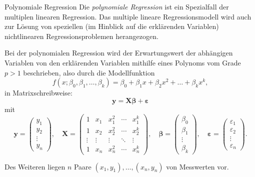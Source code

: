\begin{defi}{Polynomiale Regression}
    Die \emph{polynomiale Regression} ist ein Spezialfall der multiplen linearen Regression.
    Das multiple lineare Regressionsmodell wird auch zur Lösung von speziellen (im Hinblick auf die erklärenden Variablen) nichtlinearen Regressionsproblemen herangezogen.

    Bei der polynomialen Regression wird der Erwartungswert der abhängigen Variablen von den erklärenden Variablen mithilfe eines Polynoms vom Grade $p > 1$ beschrieben, also durch die Modellfunktion
    \[
        f(x; \beta_0, \beta_1, \ldots, \beta_k) = \beta_0 + \beta_1 x + \beta_2 x^2 + \ldots + \beta_k x^k,
    \]
    in Matrixschreibweise:
    \[
        \mathbf{y} = \mathbf{X} \boldsymbol{\beta} + \boldsymbol{\varepsilon}
    \]
    mit
    \[
        \mathbf{y} = \begin{pmatrix}
            y_1 \\ y_2 \\ \vdots \\ y_n
        \end{pmatrix},
        \quad \mathbf{X} = \begin{pmatrix}
            1      & x_{1}  & x_{1}^2 & \cdots & x_{1}^k \\
            1      & x_{2}  & x_{2}^2 & \cdots & x_{2}^k \\
            \vdots & \vdots & \vdots  & \ddots & \vdots  \\
            1      & x_{n}  & x_{n}^2 & \cdots & x_{n}^k
        \end{pmatrix},
        \quad \boldsymbol{\beta} = \begin{pmatrix}
            \beta_0 \\ \beta_1 \\ \vdots \\ \beta_k
        \end{pmatrix},
        \quad \boldsymbol{\varepsilon} = \begin{pmatrix}
            \varepsilon_1 \\ \varepsilon_2 \\ \vdots \\ \varepsilon_n
        \end{pmatrix}.
    \]


    Des Weiteren liegen $n$ Paare $(x_{1}, y_{1}),\ldots ,(x_{n},y_{n})$ von Messwerten vor.

\end{defi}

